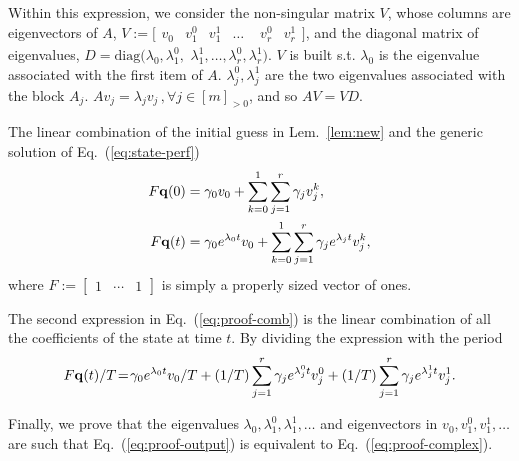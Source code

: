 \documentclass[letterpaper,10pt,journal,twoside]{IEEEtran}
\theoremstyle{definition}
\begin{document}
{Within this expression, we consider the non-singular matrix $V$, whose columns are eigenvectors of $A$, $V:=[\begin{matrix}v_0 & v_1^0 & v_1^1 & \dots\end{matrix}$ $\begin{matrix}v_r^0 & v_r^1\end{matrix}]$, and the diagonal matrix of eigenvalues, $D=\mathrm{diag}(\lambda_0,\lambda_1^0,$ $\lambda_1^1,\dots,\lambda_r^0,\lambda_r^1)$. $V$ is built s.t. $\lambda_0$ is the eigenvalue associated with the first item of $A$. $\lambda_j^0,\lambda_j^1$ are the two eigenvalues associated with the block $A_j$. $Av_j=\lambda_jv_j\,,\forall j\in[m]_{>0}$, and so $AV=VD$.

The linear combination of the initial guess in Lem.~\ref{lem:new} and the generic solution of Eq.~(\ref{eq:state-perf})
\vspace*{-1.6ex}\begin{subequations}\label{eq:proof-comb}\begin{align}
  F\mathbf{q}(0)&=\gamma_0 v_0+\sum_{k=0}^{1}{\sum_{j=1}^{r}{\gamma_j v_j^k}},\\\vspace*{-.8ex}
  F\mathbf{q}(t)&=\gamma_0 e^{\lambda_0 t} v_0+\sum_{k=0}^{1}{\sum_{j=1}^{r}{\gamma_j e^{\lambda_j t} v_j^k}},\vspace*{-.8ex}
\end{align}\end{subequations}
where $F:=\begin{bmatrix}1 & \cdots & 1\end{bmatrix}$ is simply a properly sized vector of ones. 

The second expression in Eq.~(\ref{eq:proof-comb}) is the linear combination of all the coefficients of the state at time $t$. By dividing the expression with the period
\vspace*{-1.6ex}\begin{equation}\label{eq:proof-output}
  F\mathbf{q}(t)/T\hspace*{-.4ex}=\hspace*{-.4ex}\gamma_0 e^{\lambda_0t}v_0/T+(1/T)\sum_{j=1}^r{\gamma_j e^{\lambda_j^0t}v_j^0}+(1/T)\sum_{j=1}^r{\gamma_j e^{\lambda_j^1t}v_j^1}.
\end{equation}

Finally, we prove that the eigenvalues $\lambda_0,\lambda_1^0,\lambda_1^1,\dots$ and eigenvectors in $v_0,v_1^0,v_1^1,\dots$ are such that Eq.~(\ref{eq:proof-output}) is equivalent to Eq.~(\ref{eq:proof-complex}).

}
\end{document}
